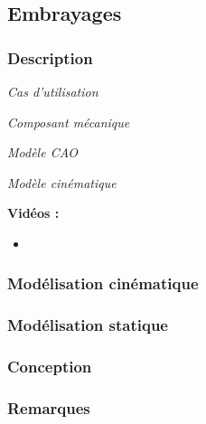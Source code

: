 \documentclass[11pt,oneside]{article}
\begin{document}
\subsection{Embrayages}
\subsubsection{Description}

\begin{center}
\hfill
\begin{minipage}[c]{.21\linewidth}
\begin{center}
\textit{Cas d'utilisation}
\end{center}
\end{minipage} \hfill
\begin{minipage}[c]{.21\linewidth}
\begin{center}
\textit{Composant mécanique}
\end{center}
\end{minipage} \hfill
\begin{minipage}[c]{.21\linewidth}
\begin{center}
\textit{Modèle CAO}
\end{center} 
\end{minipage}\hfill
\begin{minipage}[c]{.21\linewidth}
\begin{center}
\textit{Modèle cinématique}
\end{center} 
\end{minipage}\hfill
\end{center}


\textbf{Vidéos :}
\begin{itemize}
\item
\end{itemize}

\subsubsection{Modélisation cinématique}
\subsubsection{Modélisation statique}
\subsubsection{Conception}
\subsubsection{Remarques}
\end{document}
